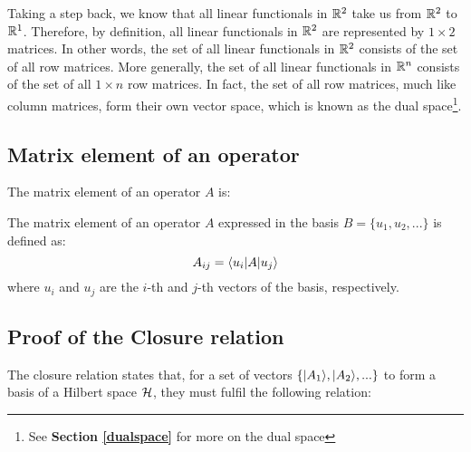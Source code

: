 Taking a step back, we know that all linear functionals in $\mathbb{R}^2$ take us from $\mathbb{R}^2$ to $\mathbb{R}^1$. Therefore, by definition, all linear functionals in $\mathbb{R}^2$ are represented by $1\times2$ matrices. In other words, the set of all linear functionals in $\mathbb{R}^2$ consists of the set of all row matrices. More generally, the set of all linear functionals in $\mathbb{R}^n$ consists of the set of all $1\times n$ row matrices. In fact, the set of all row matrices, much like column matrices, form their own vector space, which is known as the dual space\footnote{See \textbf{Section \ref{dualspace}} for more on the dual space}.

\subsection{Matrix element of an operator}

The matrix element of an operator $A$ is:
\begin{definition}
    The matrix element of an operator $A$ expressed in the basis $B = \{u_1, u_2, ...\}$ is defined as:
    \begin{equation}
        A_{ij} = \langle u_i|A|u_j\rangle
    \end{equation}
    where $u_i$ and $u_j$ are the $i$-th and $j$-th vectors of the basis, respectively.
\end{definition}

\subsection{Proof of the Closure relation} \label{closure_relation_proof}

The closure relation states that, for a set of vectors $\{|A_1\rangle, |A_2\rangle, ...\}$ to form a basis of a Hilbert space $\mathcal{H}$, they must fulfil the following relation:

